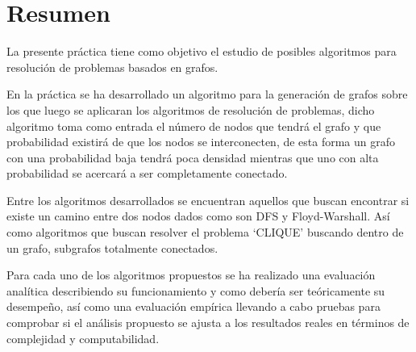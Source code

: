 \part{Resumen}
La presente práctica tiene como objetivo el estudio de posibles algoritmos para resolución de problemas basados en grafos.

En la práctica se ha desarrollado un algoritmo para la generación de grafos sobre los que luego se aplicaran los algoritmos de resolución de problemas, dicho algoritmo toma como entrada el número de nodos que tendrá el grafo y que probabilidad existirá de que los nodos se interconecten, de esta forma un grafo con una probabilidad baja tendrá poca densidad mientras que uno con alta probabilidad se acercará a ser completamente conectado.

Entre los algoritmos desarrollados se encuentran aquellos que buscan encontrar si existe un camino entre dos nodos dados como son DFS y Floyd-Warshall. 
Así como algoritmos que buscan resolver el problema `CLIQUE' buscando dentro de un grafo, subgrafos totalmente conectados.

Para cada uno de los algoritmos propuestos se ha realizado una evaluación analítica describiendo su funcionamiento y como debería ser teóricamente su desempeño, así como una evaluación empírica llevando a cabo pruebas para comprobar si el análisis propuesto se ajusta a los resultados reales en términos de complejidad y computabilidad.